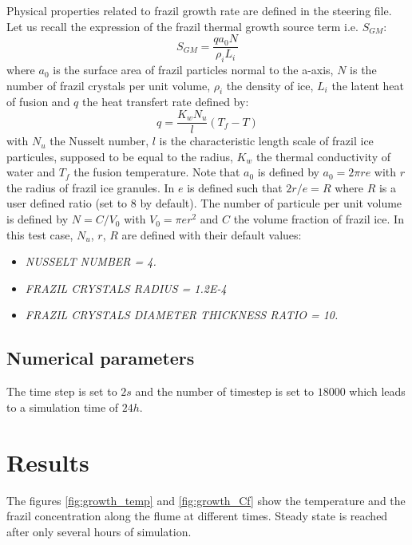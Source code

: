 Physical properties related to frazil growth rate are defined in the \khione steering file. Let us recall
the expression of the frazil thermal growth source term i.e. $S_{GM}$:
\begin{equation}
S_{GM} = \dfrac{q a_0 N}{\rho_i L_i}
\end{equation}
where $a_0$ is the surface area of frazil particles normal to the a-axis, $N$ is the number of frazil crystals
per unit volume, $\rho_i$ the density of ice, $L_i$ the latent heat of fusion and $q$ the heat transfert rate
defined by:
\begin{equation}
q = \dfrac{K_w N_u}{l} (T_f-T)
\end{equation}
with $N_u$ the Nusselt number, $l$ is the characteristic length scale of frazil ice particules, supposed to be equal to the radius, $K_w$ the thermal conductivity of water and $T_f$ the fusion temperature. Note that $a_0$ is defined by $a_0 = 2 \pi r e$ with $r$ the radius of frazil ice granules. In \khione $e$ is defined such that $2 r/e = R$ where $R$ is a user defined ratio (set to $8$ by default). The number of particule per unit volume is defined by $N=C/V_0$ with $V_0=\pi e r^2$ and $C$ the volume fraction of frazil ice.
In this test case, $N_u$, $r$, $R$ are defined with their default values:
\begin{itemize}
	\item\textit{NUSSELT NUMBER = 4.}
	\item\textit{FRAZIL CRYSTALS RADIUS = 1.2E-4}
	\item\textit{FRAZIL CRYSTALS DIAMETER THICKNESS RATIO  = 10.}
\end{itemize}

\subsection{Numerical parameters}
The time step is set to $2s$ and the number of timestep is set to $18000$ which leads to a simulation time of $24h$.

\section{Results}
The figures \ref{fig:growth_temp} and \ref{fig:growth_Cf} show the temperature and the frazil concentration along the flume at different times. Steady state is reached after only several hours of simulation. 


